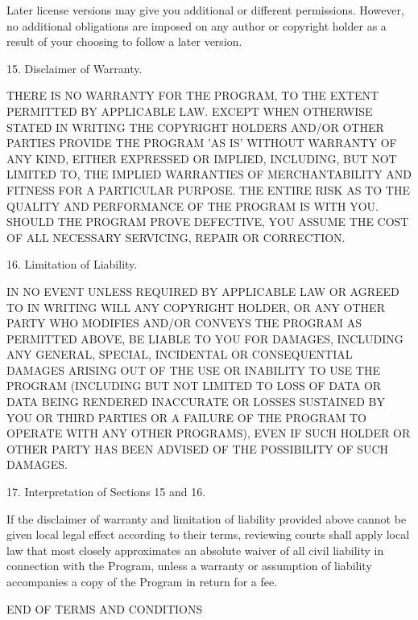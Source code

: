 \documentclass{article}
\begin{document}
  Later license versions may give you additional or different
permissions.  However, no additional obligations are imposed on any
author or copyright holder as a result of your choosing to follow a
later version.

  15. Disclaimer of Warranty.

  THERE IS NO WARRANTY FOR THE PROGRAM, TO THE EXTENT PERMITTED BY
APPLICABLE LAW.  EXCEPT WHEN OTHERWISE STATED IN WRITING THE COPYRIGHT
HOLDERS AND/OR OTHER PARTIES PROVIDE THE PROGRAM 'AS IS' WITHOUT WARRANTY
OF ANY KIND, EITHER EXPRESSED OR IMPLIED, INCLUDING, BUT NOT LIMITED TO,
THE IMPLIED WARRANTIES OF MERCHANTABILITY AND FITNESS FOR A PARTICULAR
PURPOSE.  THE ENTIRE RISK AS TO THE QUALITY AND PERFORMANCE OF THE PROGRAM
IS WITH YOU.  SHOULD THE PROGRAM PROVE DEFECTIVE, YOU ASSUME THE COST OF
ALL NECESSARY SERVICING, REPAIR OR CORRECTION.

  16. Limitation of Liability.

  IN NO EVENT UNLESS REQUIRED BY APPLICABLE LAW OR AGREED TO IN WRITING
WILL ANY COPYRIGHT HOLDER, OR ANY OTHER PARTY WHO MODIFIES AND/OR CONVEYS
THE PROGRAM AS PERMITTED ABOVE, BE LIABLE TO YOU FOR DAMAGES, INCLUDING ANY
GENERAL, SPECIAL, INCIDENTAL OR CONSEQUENTIAL DAMAGES ARISING OUT OF THE
USE OR INABILITY TO USE THE PROGRAM (INCLUDING BUT NOT LIMITED TO LOSS OF
DATA OR DATA BEING RENDERED INACCURATE OR LOSSES SUSTAINED BY YOU OR THIRD
PARTIES OR A FAILURE OF THE PROGRAM TO OPERATE WITH ANY OTHER PROGRAMS),
EVEN IF SUCH HOLDER OR OTHER PARTY HAS BEEN ADVISED OF THE POSSIBILITY OF
SUCH DAMAGES.

  17. Interpretation of Sections 15 and 16.

  If the disclaimer of warranty and limitation of liability provided
above cannot be given local legal effect according to their terms,
reviewing courts shall apply local law that most closely approximates
an absolute waiver of all civil liability in connection with the
Program, unless a warranty or assumption of liability accompanies a
copy of the Program in return for a fee.

                     END OF TERMS AND CONDITIONS
\end{document}
